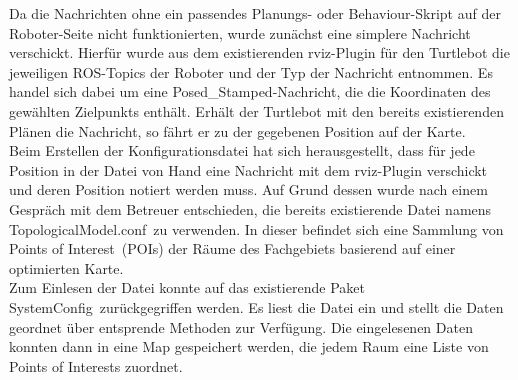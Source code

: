 \documentclass[a4paper,12pt,headsepline]{scrartcl}
\begin{document}
		Da die Nachrichten ohne ein passendes Planungs- oder Behaviour-Skript auf der Roboter-Seite nicht funktionierten, wurde zunächst eine simplere Nachricht verschickt. Hierfür wurde aus dem existierenden rviz-Plugin für den Turtlebot die jeweiligen ROS-Topics der Roboter und der Typ der Nachricht entnommen. Es handel sich dabei um eine \glqq Posed\_Stamped\grqq -Nachricht, die die Koordinaten des gewählten Zielpunkts enthält. Erhält der Turtlebot mit den bereits existierenden Plänen die Nachricht, so fährt er zu der gegebenen Position auf der Karte.\\
		Beim Erstellen der Konfigurationsdatei hat sich herausgestellt, dass für jede Position in der Datei von Hand eine Nachricht mit dem rviz-Plugin verschickt und deren Position notiert werden muss. Auf Grund dessen wurde nach einem Gespräch mit dem Betreuer entschieden, die bereits existierende Datei namens \glqq TopologicalModel.conf\grqq\ zu verwenden. In dieser befindet sich eine Sammlung von \glqq Points of Interest\grqq\ (POIs) der Räume des Fachgebiets basierend auf einer optimierten Karte.\\
Zum Einlesen der Datei konnte auf das existierende Paket \glqq SystemConfig\grqq\ zurückgegriffen werden. Es liest die Datei ein und stellt die Daten geordnet über entsprende Methoden zur Verfügung. Die eingelesenen Daten konnten dann in eine Map gespeichert werden, die jedem Raum eine Liste von Points of Interests zuordnet.\\
\end{document}
